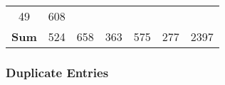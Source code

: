 \documentclass[]{article}
\newenvironment{Shaded}{\begin{snugshade}}{\end{snugshade}}
\newcommand{\KeywordTok}[1]{\textcolor[rgb]{0.13,0.29,0.53}{\textbf{{#1}}}}
\newcommand{\StringTok}[1]{\textcolor[rgb]{0.31,0.60,0.02}{{#1}}}
\newcommand{\NormalTok}[1]{{#1}}
\begin{document}
\begin{longtable}[]{@{}ccccccc@{}}
\begin{minipage}[t]{0.05\columnwidth}
49\strut
\end{minipage} & \begin{minipage}[t]{0.05\columnwidth}\centering\strut
608\strut
\end{minipage}\tabularnewline
\begin{minipage}[t]{0.26\columnwidth}\centering\strut
\textbf{Sum}\strut
\end{minipage} & \begin{minipage}[t]{0.13\columnwidth}\centering\strut
524\strut
\end{minipage} & \begin{minipage}[t]{0.14\columnwidth}\centering\strut
658\strut
\end{minipage} & \begin{minipage}[t]{0.14\columnwidth}\centering\strut
363\strut
\end{minipage} & \begin{minipage}[t]{0.05\columnwidth}\centering\strut
575\strut
\end{minipage} & \begin{minipage}[t]{0.05\columnwidth}\centering\strut
277\strut
\end{minipage} & \begin{minipage}[t]{0.05\columnwidth}\centering\strut
2397\strut
\end{minipage}\tabularnewline
\bottomrule
\end{longtable}

\subsubsection{Duplicate Entries}\label{duplicate-entries}

\begin{Shaded}
\end{Shaded}
\end{document}
